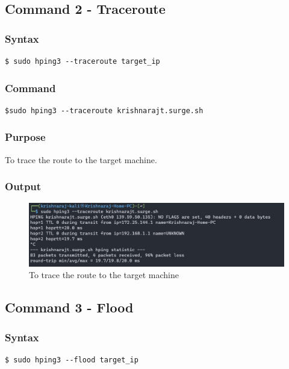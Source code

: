 \documentclass[11pt]{article}
\begin{document}
\subsection{Command 2 - Traceroute}

\subsubsection*{Syntax}
\begin{verbatim}
$ sudo hping3 --traceroute target_ip
\end{verbatim}

\subsubsection*{Command}
\begin{verbatim}
$sudo hping3 --traceroute krishnarajt.surge.sh
\end{verbatim}


\subsubsection*{Purpose}
To trace the route to the target machine.

\subsubsection*{Output}
\begin{figure}[H]
    \centering
    \includegraphics[width=1.0\textwidth]{hping trace.jpg}
    \caption{To trace the route to the target machine}
    \label{fig:2}
\end{figure}

\subsection{Command 3 - Flood}

\subsubsection*{Syntax}
\begin{verbatim}
$ sudo hping3 --flood target_ip
\end{verbatim}
\end{document}
